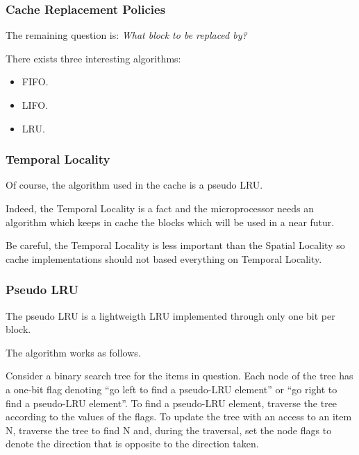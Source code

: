 \begin{frame}
  \frametitle{Cache Replacement Policies}

  The remaining question is: \textit{What block to be replaced by?}

  \nl

  There exists three interesting algorithms:

  \begin{itemize}[<+->]
    \item
      FIFO.
    \item
      LIFO.
    \item
      LRU.
  \end{itemize}
\end{frame}


\begin{frame}
  \frametitle{Temporal Locality}

  Of course, the algorithm used in the cache is a pseudo LRU.

  \nl

  Indeed, the Temporal Locality is a fact and the microprocessor needs
  an algorithm which keeps in cache the blocks which will be used in a near
  futur.

  \nl

  Be careful, the Temporal Locality is less important than the Spatial
  Locality so cache implementations should not based everything on
  Temporal Locality.

  \begin{center}
  \end{center}
\end{frame}


\begin{frame}
  \frametitle{Pseudo LRU}

  The pseudo LRU is a lightweigth LRU implemented through only one bit
  per block.

  \nl

  The algorithm works as follows.

  \nl

  Consider a binary search tree for the items in question. Each node of
  the tree has a one-bit flag denoting ``go left to find a pseudo-LRU element''
  or ``go right to find a pseudo-LRU element''. To find a pseudo-LRU element,
  traverse the tree according to the values of the flags. To update the
  tree with an access to an item N, traverse the tree to find N and, during
  the traversal, set the node flags to denote the direction that is opposite
  to the direction taken.
\end{frame}

